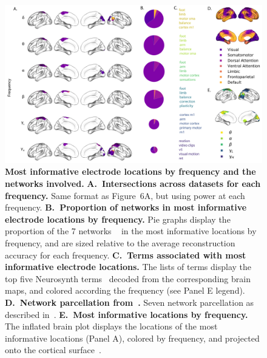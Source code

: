 \documentclass[10pt]{article}
\begin{document}
\begin{figure}[ptb]
\centering
\includegraphics[width=\textwidth]{figs/supplemental_5}
\caption{\textbf{Most informative electrode locations by frequency
      and the networks involved.}
    \textbf{A.~Intersections across datasets for each frequency.}  Same format as Figure~6A, but
    using power at each frequency.
    \textbf{B.~Proportion of networks in most informative electrode locations by
    frequency.}  Pie graphs display the proportion of the 7 networks
  ~\citep{YeoEtal11} in the most informative locations by
  frequency, and are sized relative to the average reconstruction
  accuracy for each frequency. \textbf{C.~Terms associated with most informative
    electrode locations.}  The
    lists of terms display the top five Neurosynth
    terms~\citep{RubiEtal17} decoded from the corresponding brain
    maps, and colored according the frequency (see Panel
    E legend). \textbf{D.~Network parcellation from~\citep{YeoEtal11}.}
    Seven network parcellation as described
    in~\citep{YeoEtal11}. \textbf{E.~Most informative locations by
      frequency.} The inflated brain plot displays the locations of
    the most informative locations (Panel A), colored by frequency,
    and projected onto the cortical surface~\citep{CombEtal19}.}
\label{fig:supplemental_5}
\end{figure}
\end{document}
